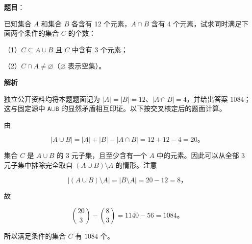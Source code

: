 \begin{answer}

\textbf{题目}：

已知集合 $A$ 和集合 $B$ 各含有 12 个元素，$A\cap B$ 含有 4 个元素，试求同时满足下面两个条件的集合 $C$ 的个数：

（1）$C\subseteq A\cup B$ 且 $C$ 中含有 3 个元素；

（2）$C\cap A\ne\varnothing$（$\varnothing$ 表示空集）。

\textbf{解析}

独立公开资料均将本题题面记为 $|A|=|B|=12$、$|A\cap B|=4$，并给出答案 $1084$；这与固定源中 \texttt{A$\cup$B} 的显然矛盾相互印证。以下按交叉核定后的题面计算。

由

\nopagebreak[4]
\[
|A\cup B|=|A|+|B|-|A\cap B|=12+12-4=20。
\]

集合 $C$ 是 $A\cup B$ 的 3 元子集，且至少含有一个 $A$ 中的元素。因此可以从全部 3 元子集中排除完全取自 $(A\cup B)\setminus A$ 的情形。注意

\nopagebreak[4]
\[
|(A\cup B)\setminus A|=|B\setminus A|=20-12=8\text{，}
\]

故

\nopagebreak[4]
\[
\binom{20}{3}-\binom{8}{3}=1140-56=1084。
\]

所以满足条件的集合 $C$ 有 $1084$ 个。


\end{answer}
